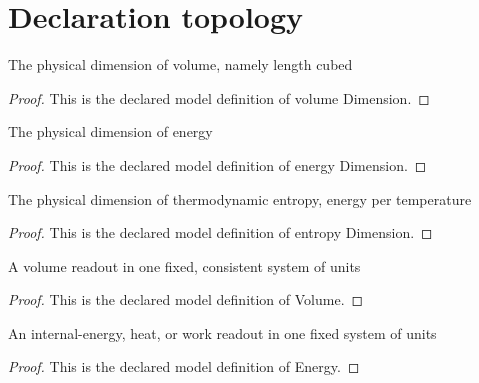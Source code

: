 \section{Declaration topology}
\begin{definition}
  \label{def:physics:phyx-mini-0475:phyxmini0475-volumedimension}
  The physical dimension of volume, namely length cubed
\end{definition}
\begin{proof}
  This is the declared model definition of volume Dimension.
\end{proof}
\begin{definition}
  \label{def:physics:phyx-mini-0475:phyxmini0475-energydimension}
  The physical dimension of energy
\end{definition}
\begin{proof}
  This is the declared model definition of energy Dimension.
\end{proof}
\begin{definition}
  \label{def:physics:phyx-mini-0475:phyxmini0475-entropydimension}
  The physical dimension of thermodynamic entropy, energy per temperature
\end{definition}
\begin{proof}
  This is the declared model definition of entropy Dimension.
\end{proof}
\begin{definition}[Volume]
  \label{def:physics:phyx-mini-0475:phyxmini0475-volume}
  A volume readout in one fixed, consistent system of units
\end{definition}
\begin{proof}
  This is the declared model definition of Volume.
\end{proof}
\begin{definition}[Energy]
  \label{def:physics:phyx-mini-0475:phyxmini0475-energy}
  An internal-energy, heat, or work readout in one fixed system of units
\end{definition}
\begin{proof}
  This is the declared model definition of Energy.
\end{proof}
